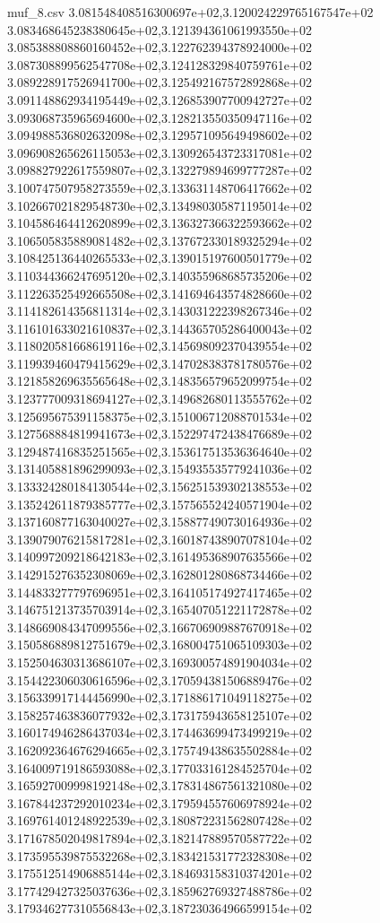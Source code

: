 \begin{filecontents*}{muf_8.csv}
3.081548408516300697e+02,3.120024229765167547e+02
3.083468645238380645e+02,3.121394361061993550e+02
3.085388808860160452e+02,3.122762394378924000e+02
3.087308899562547708e+02,3.124128329840759761e+02
3.089228917526941700e+02,3.125492167572892868e+02
3.091148862934195449e+02,3.126853907700942727e+02
3.093068735965694600e+02,3.128213550350947116e+02
3.094988536802632098e+02,3.129571095649498602e+02
3.096908265626115053e+02,3.130926543723317081e+02
3.098827922617559807e+02,3.132279894699777287e+02
3.100747507958273559e+02,3.133631148706417662e+02
3.102667021829548730e+02,3.134980305871195014e+02
3.104586464412620899e+02,3.136327366322593662e+02
3.106505835889081482e+02,3.137672330189325294e+02
3.108425136440265533e+02,3.139015197600501779e+02
3.110344366247695120e+02,3.140355968685735206e+02
3.112263525492665508e+02,3.141694643574828660e+02
3.114182614356811314e+02,3.143031222398267346e+02
3.116101633021610837e+02,3.144365705286400043e+02
3.118020581668619116e+02,3.145698092370439554e+02
3.119939460479415629e+02,3.147028383781780576e+02
3.121858269635565648e+02,3.148356579652099754e+02
3.123777009318694127e+02,3.149682680113555762e+02
3.125695675391158375e+02,3.151006712088701534e+02
3.127568884819941673e+02,3.152297472438476689e+02
3.129487416835251565e+02,3.153617513536364640e+02
3.131405881896299093e+02,3.154935535779241036e+02
3.133324280184130544e+02,3.156251539302138553e+02
3.135242611879385777e+02,3.157565524240571904e+02
3.137160877163040027e+02,3.158877490730164936e+02
3.139079076215817281e+02,3.160187438907078104e+02
3.140997209218642183e+02,3.161495368907635566e+02
3.142915276352308069e+02,3.162801280868734466e+02
3.144833277797696951e+02,3.164105174927417465e+02
3.146751213735703914e+02,3.165407051221172878e+02
3.148669084347099556e+02,3.166706909887670918e+02
3.150586889812751679e+02,3.168004751065109303e+02
3.152504630313686107e+02,3.169300574891904034e+02
3.154422306030616596e+02,3.170594381506889476e+02
3.156339917144456990e+02,3.171886171049118275e+02
3.158257463836077932e+02,3.173175943658125107e+02
3.160174946286437034e+02,3.174463699473499219e+02
3.162092364676294665e+02,3.175749438635502884e+02
3.164009719186593088e+02,3.177033161284525704e+02
3.165927009998192148e+02,3.178314867561321080e+02
3.167844237292010234e+02,3.179594557606978924e+02
3.169761401248922539e+02,3.180872231562807428e+02
3.171678502049817894e+02,3.182147889570587722e+02
3.173595539875532268e+02,3.183421531772328308e+02
3.175512514906885144e+02,3.184693158310374201e+02
3.177429427325037636e+02,3.185962769327488786e+02
3.179346277310556843e+02,3.187230364966599154e+02

\end{filecontents*}
